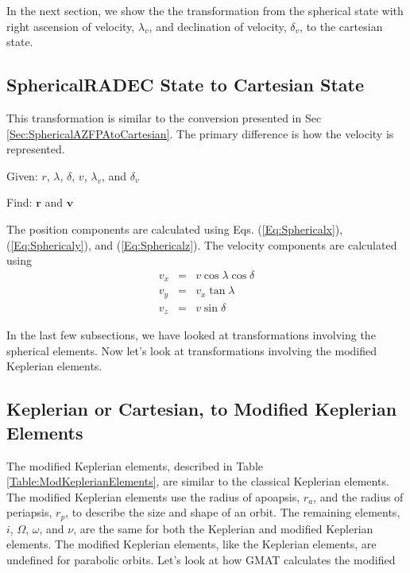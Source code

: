 In the next section, we show the the transformation from the
spherical state  with right ascension of velocity, $\lambda_v$,
and declination of velocity, $\delta_v$, to the cartesian state.

\subsection{SphericalRADEC State to Cartesian State} 

This transformation is similar to the conversion presented in Sec
\ref{Sec:SphericalAZFPAtoCartesian}.  The primary difference is
how the velocity is represented.

\noindent Given:  $r$, $\lambda$, $\delta$, $v$, $\lambda_v$, and
$\delta_v$

\noindent Find:  $\mathbf{r}$ and $\mathbf{v}$

The position components are calculated using Eqs.
(\ref{Eq:Sphericalx}), (\ref{Eq:Sphericaly}), and
(\ref{Eq:Sphericalz}).  The velocity components are calculated
using
%
\begin{eqnarray}
    v_x &=& v\cos{\lambda}\cos{\delta}\\
    v_y &=& v_x\tan{\lambda}\\
    v_z &=& v\sin{\delta}
\end{eqnarray}

In the last few subsections, we have looked at transformations
involving the spherical elements.  Now let's look at
transformations involving the modified Keplerian elements.

\subsection{Keplerian or Cartesian, to Modified Keplerian Elements}  

The modified Keplerian elements, described in Table
\ref{Table:ModKeplerianElements}, are similar to the classical
Keplerian elements.  The modified Keplerian elements use the
radius of apoapsis, $r_a$, and the radius of periapsis, $r_p$, to
describe the size and shape of an orbit.  The remaining elements,
$i$, $\Omega$, $\omega$, and $\nu$, are the same for both the
Keplerian and modified Keplerian elements. The modified Keplerian
elements, like the Keplerian elements, are undefined for parabolic
orbits.  Let's look at how GMAT calculates the modified


